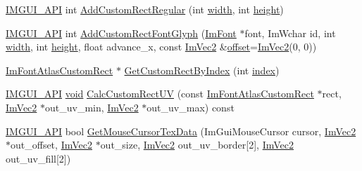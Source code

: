 \begin{DoxyCompactItemize}
\item 
\hyperlink{imgui_8h_a43829975e84e45d1149597467a14bbf5}{I\+M\+G\+U\+I\+\_\+\+A\+PI} int \hyperlink{structImFontAtlas_af048760e2d58ec93446e345deb887259}{Add\+Custom\+Rect\+Regular} (int \hyperlink{imgui__impl__opengl3__loader_8h_a6879d830f164725df67adeeabca3ea47}{width}, int \hyperlink{imgui__impl__opengl3__loader_8h_a60075de22f90a1223dc0bea98d2ee4d5}{height})
\item 
\hyperlink{imgui_8h_a43829975e84e45d1149597467a14bbf5}{I\+M\+G\+U\+I\+\_\+\+A\+PI} int \hyperlink{structImFontAtlas_a5643182be4e3f1a442cfa6cdc0321c7c}{Add\+Custom\+Rect\+Font\+Glyph} (\hyperlink{structImFont}{Im\+Font} $\ast$font, Im\+Wchar id, int \hyperlink{imgui__impl__opengl3__loader_8h_a6879d830f164725df67adeeabca3ea47}{width}, int \hyperlink{imgui__impl__opengl3__loader_8h_a60075de22f90a1223dc0bea98d2ee4d5}{height}, float advance\+\_\+x, const \hyperlink{structImVec2}{Im\+Vec2} \&\hyperlink{imgui__impl__opengl3__loader_8h_ae1b92ae085ddef4b1cdca7d749339fb0}{offset}=\hyperlink{structImVec2}{Im\+Vec2}(0, 0))
\item 
\hyperlink{structImFontAtlasCustomRect}{Im\+Font\+Atlas\+Custom\+Rect} $\ast$ \hyperlink{structImFontAtlas_a82db74e25651eafb39c5aca90f1cf22a}{Get\+Custom\+Rect\+By\+Index} (int \hyperlink{imgui__impl__opengl3__loader_8h_a57f14e05b1900f16a2da82ade47d0c6d}{index})
\item 
\hyperlink{imgui_8h_a43829975e84e45d1149597467a14bbf5}{I\+M\+G\+U\+I\+\_\+\+A\+PI} \hyperlink{imgui__impl__opengl3__loader_8h_ac668e7cffd9e2e9cfee428b9b2f34fa7}{void} \hyperlink{structImFontAtlas_a66bb70a3c3dab00bd714fc52e2195882}{Calc\+Custom\+Rect\+UV} (const \hyperlink{structImFontAtlasCustomRect}{Im\+Font\+Atlas\+Custom\+Rect} $\ast$rect, \hyperlink{structImVec2}{Im\+Vec2} $\ast$out\+\_\+uv\+\_\+min, \hyperlink{structImVec2}{Im\+Vec2} $\ast$out\+\_\+uv\+\_\+max) const
\item 
\hyperlink{imgui_8h_a43829975e84e45d1149597467a14bbf5}{I\+M\+G\+U\+I\+\_\+\+A\+PI} bool \hyperlink{structImFontAtlas_a6d27a36fe034851310dd00d7dc5253c3}{Get\+Mouse\+Cursor\+Tex\+Data} (Im\+Gui\+Mouse\+Cursor cursor, \hyperlink{structImVec2}{Im\+Vec2} $\ast$out\+\_\+offset, \hyperlink{structImVec2}{Im\+Vec2} $\ast$out\+\_\+size, \hyperlink{structImVec2}{Im\+Vec2} out\+\_\+uv\+\_\+border\mbox{[}2\mbox{]}, \hyperlink{structImVec2}{Im\+Vec2} out\+\_\+uv\+\_\+fill\mbox{[}2\mbox{]})
\end{DoxyCompactItemize}
